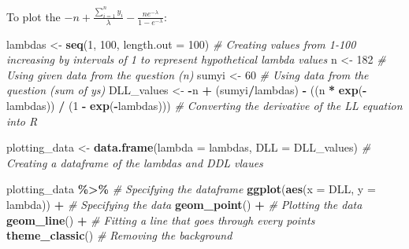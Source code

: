 \documentclass[
]{article}
\newenvironment{Shaded}{\begin{snugshade}}{\end{snugshade}}
\newcommand{\AttributeTok}[1]{\textcolor[rgb]{0.13,0.29,0.53}{#1}}
\newcommand{\CommentTok}[1]{\textcolor[rgb]{0.56,0.35,0.01}{\textit{#1}}}
\newcommand{\DecValTok}[1]{\textcolor[rgb]{0.00,0.00,0.81}{#1}}
\newcommand{\FunctionTok}[1]{\textcolor[rgb]{0.13,0.29,0.53}{\textbf{#1}}}
\newcommand{\NormalTok}[1]{#1}
\newcommand{\OtherTok}[1]{\textcolor[rgb]{0.56,0.35,0.01}{#1}}
\newcommand{\SpecialCharTok}[1]{\textcolor[rgb]{0.81,0.36,0.00}{\textbf{#1}}}
\begin{document}
To plot the
\(-n + \frac{\sum_{i=1}^n y_i}{\lambda}-\frac{ne^{-\lambda}}{1-e^{-\lambda}}\):\\

\begin{Shaded}
\begin{Highlighting}[]
\NormalTok{lambdas }\OtherTok{\textless{}{-}} \FunctionTok{seq}\NormalTok{(}\DecValTok{1}\NormalTok{, }\DecValTok{100}\NormalTok{, }\AttributeTok{length.out =} \DecValTok{100}\NormalTok{) }\CommentTok{\# Creating values from 1{-}100 increasing by intervals of 1 to represent hypothetical lambda values}
\NormalTok{n }\OtherTok{\textless{}{-}} \DecValTok{182}  \CommentTok{\# Using given data from the question (n)}
\NormalTok{sumyi }\OtherTok{\textless{}{-}} \DecValTok{60} \CommentTok{\# Using data from the question (sum of ys)}
\NormalTok{DLL\_values }\OtherTok{\textless{}{-}}  \SpecialCharTok{{-}}\NormalTok{n }\SpecialCharTok{+}\NormalTok{ (sumyi}\SpecialCharTok{/}\NormalTok{lambdas) }\SpecialCharTok{{-}}\NormalTok{ ((n }\SpecialCharTok{*} \FunctionTok{exp}\NormalTok{(}\SpecialCharTok{{-}}\NormalTok{lambdas)) }\SpecialCharTok{/}\NormalTok{ (}\DecValTok{1} \SpecialCharTok{{-}} \FunctionTok{exp}\NormalTok{(}\SpecialCharTok{{-}}\NormalTok{lambdas)))  }\CommentTok{\# Converting the derivative of the LL equation into R}


\NormalTok{plotting\_data }\OtherTok{\textless{}{-}} \FunctionTok{data.frame}\NormalTok{(}\AttributeTok{lambda =}\NormalTok{ lambdas, }\AttributeTok{DLL =}\NormalTok{ DLL\_values)  }\CommentTok{\# Creating a dataframe of the lambdas and DDL vlaues}


\NormalTok{plotting\_data }\SpecialCharTok{\%\textgreater{}\%}  \CommentTok{\# Specifying the dataframe}
  \FunctionTok{ggplot}\NormalTok{(}\FunctionTok{aes}\NormalTok{(}\AttributeTok{x =}\NormalTok{ DLL, }\AttributeTok{y =}\NormalTok{ lambda)) }\SpecialCharTok{+}  \CommentTok{\# Specifying the data}
  \FunctionTok{geom\_point}\NormalTok{() }\SpecialCharTok{+}  \CommentTok{\# Plotting the  data }
  \FunctionTok{geom\_line}\NormalTok{() }\SpecialCharTok{+}  \CommentTok{\# Fitting a line that goes through every points}
  \FunctionTok{theme\_classic}\NormalTok{()  }\CommentTok{\# Removing the background}
\end{Highlighting}
\end{Shaded}
\end{document}

